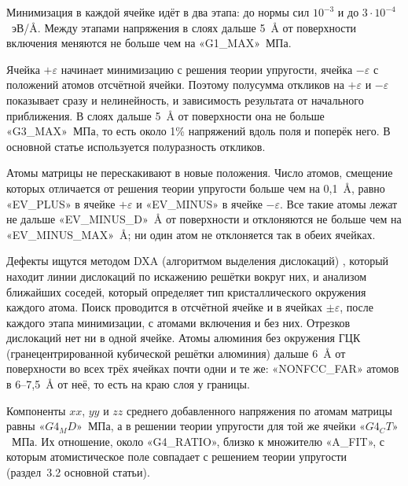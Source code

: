 Минимизация в каждой ячейке идёт в два этапа: до нормы сил $10^{-3}$
и до $3\cdot10^{-4}$~эВ/\AA. Между этапами напряжения в слоях дальше 5~\AA{}
от поверхности включения меняются не больше чем на «G1_MAX»~МПа.

Ячейка $+\varepsilon$ начинает минимизацию с решения теории упругости,
ячейка $-\varepsilon$ с положений атомов отсчётной ячейки. Поэтому
полусумма откликов на $+\varepsilon$ и $-\varepsilon$ показывает сразу
и нелинейность, и зависимость результата от начального приближения.
В слоях дальше 5~\AA{} от поверхности она не больше «G3_MAX»~МПа, то есть
около 1\% напряжений вдоль поля и поперёк него. В основной статье
используется полуразность откликов.

Атомы матрицы не перескакивают в новые положения. Число атомов, смещение
которых отличается от решения теории упругости больше чем на 0{,}1~\AA,
равно «EV_PLUS» в ячейке $+\varepsilon$ и «EV_MINUS» в ячейке $-\varepsilon$.
Все такие атомы лежат не дальше «EV_MINUS_D»~\AA{} от поверхности
и отклоняются не больше чем на «EV_MINUS_MAX»~\AA; ни один атом не
отклоняется так в обеих ячейках.

Дефекты ищутся методом DXA (алгоритмом выделения дислокаций)
\cite{Stukowski2012DXA}, который находит линии дислокаций по искажению
решётки вокруг них, и анализом ближайших соседей, который определяет тип
кристаллического окружения каждого атома. Поиск проводится в отсчётной
ячейке и в ячейках $\pm\varepsilon$, после каждого этапа минимизации,
с атомами включения и без них. Отрезков дислокаций нет ни в одной ячейке.
Атомы алюминия без окружения ГЦК (гранецентрированной кубической решётки
алюминия) дальше 6~\AA{} от
поверхности во всех трёх ячейках почти одни и те же: «NONFCC_FAR» атомов
в 6--7{,}5~\AA{} от неё, то есть на краю слоя у границы.

Компоненты $xx$, $yy$ и $zz$ среднего добавленного напряжения по атомам
матрицы равны $«G4_MD»$~МПа, а в решении теории упругости для той же
ячейки $«G4_CT»$~МПа. Их отношение, около «G4_RATIO», близко к множителю
«A_FIT», с которым атомистическое поле совпадает с решением теории
упругости (раздел~3.2 основной статьи).

